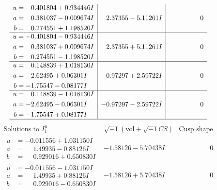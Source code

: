 \documentclass[1p]{elsarticle_modified}
\theoremstyle{definition}
\newcommand{\I}{\sqrt{-1}}
\begin{document}
$$\begin{array}{c|c|c}
\begin{aligned}
u &= -0.401804 + 0.934446 I \\
a &= \phantom{-}0.381037 - 0.009674 I \\
b &= \phantom{-}0.274551 + 1.198520 I\end{aligned}
 & \phantom{-}2.37355 - 5.11261 I & \phantom{-0.000000 } 0 \\ \hline\begin{aligned}
u &= -0.401804 - 0.934446 I \\
a &= \phantom{-}0.381037 + 0.009674 I \\
b &= \phantom{-}0.274551 - 1.198520 I\end{aligned}
 & \phantom{-}2.37355 + 5.11261 I & \phantom{-0.000000 } 0 \\ \hline\begin{aligned}
u &= \phantom{-}0.148839 + 1.018130 I \\
a &= -2.62495 + 0.06301 I \\
b &= -1.75547 - 0.08177 I\end{aligned}
 & -0.97297 + 2.59722 I & \phantom{-0.000000 } 0 \\ \hline\begin{aligned}
u &= \phantom{-}0.148839 - 1.018130 I \\
a &= -2.62495 - 0.06301 I \\
b &= -1.75547 + 0.08177 I\end{aligned}
 & -0.97297 - 2.59722 I & \phantom{-0.000000 } 0\\
 \hline 
 \end{array}$$\newpage$$\begin{array}{c|c|c}  
\text{Solutions to }I^u_{1}& \I (\text{vol} + \sqrt{-1}CS) & \text{Cusp shape}\\
 \hline 
\begin{aligned}
u &= -0.011556 + 1.031150 I \\
a &= \phantom{-}1.49935 - 0.88126 I \\
b &= \phantom{-}0.929016 + 0.650830 I\end{aligned}
 & -1.58126 - 5.70438 I & \phantom{-0.000000 } 0 \\ \hline\begin{aligned}
u &= -0.011556 - 1.031150 I \\
a &= \phantom{-}1.49935 + 0.88126 I \\
b &= \phantom{-}0.929016 - 0.650830 I\end{aligned}
 & -1.58126 + 5.70438 I & \phantom{-0.000000 } 0 \\ \hline\begin{aligned}

\end{aligned}
\end{array}$$
\end{document}
